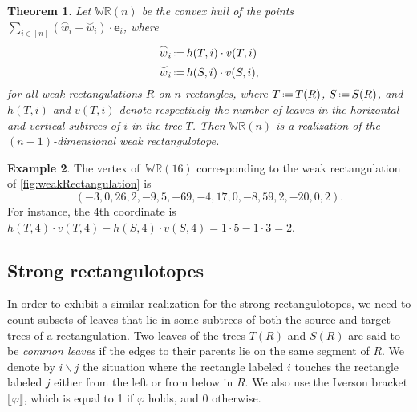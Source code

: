 \documentclass{amsart}
\newtheorem{theorem}{Theorem}%
\theoremstyle{definition}
\newtheorem{example}[theorem]{Example}
\newcommand{\eqdef}{\mbox{\,\raisebox{0.2ex}{\scriptsize\ensuremath{\mathrm:}}\ensuremath{=}\,}} %
\newcommand{\darkblue}{\color{darkblue}} %
\newcommand{\defn}[1]{\textsl{\darkblue #1}} %
\newcommand{\polytope}[1]{\mathds{#1}} %
\newcommand{\WRP}{\polytope{WR}} %
\newcommand{\loday}[1]{\overset{\frown}{#1}}
\newcommand{\antiloday}[1]{\overset{\smile}{#1}}
\begin{document}
\begin{theorem}
  Let $\WRP (n)$ be the convex hull of the points
  $\sum_{i\in [n]} (\loday{w}_i - \antiloday{w}_i)\cdot \mathbf{e}_i$,
  where
  \[
  \begin{split}
    \loday{w}_i \eqdef & h(T, i)\cdot v(T,i) \\
    \antiloday{w}_i \eqdef & h(S, i)\cdot v(S,i),
  \end{split}
  \]
  for all weak rectangulations $R$ on $n$ rectangles, where $T \eqdef T(R)$, $S \eqdef S(R)$,
  and $h(T,i)$ and $v(T,i)$ denote respectively the number of leaves in the horizontal and vertical subtrees of $i$ in the tree $T$.
  Then $\WRP (n)$ is a realization of the $(n-1)$-dimensional weak rectangulotope.
\end{theorem}

\begin{example}
The vertex of~$\WRP (16)$ corresponding to the weak rectangulation of \cref{fig:weakRectangulation} is
\[
(-3, 0, 26, 2, -9, 5, -69, -4, 17, 0, -8, 59, 2, -20, 0, 2).
\]
For instance, the $4$th coordinate is $h(T, 4) \cdot v(T, 4) - h(S, 4) \cdot v(S, 4) = 1 \cdot 5 - 1 \cdot 3 = 2$.
\end{example}

\subsection{Strong rectangulotopes}

In order to exhibit a similar realization for the strong rectangulotopes, we need to count subsets of leaves that lie in some subtrees of both the source and target trees of a rectangulation.
Two leaves of the trees $T(R)$ and $S(R)$ are said to be \defn{common leaves} if the edges to their parents lie on the same segment of $R$. We denote by %
$i\backslash j$ the situation where the rectangle labeled $i$ touches the rectangle labeled $j$ either from the left or from below in $R$. %
We also use the Iverson bracket $\llbracket \varphi\rrbracket$, which is equal to 1 if $\varphi$ holds, and 0 otherwise.
\end{document}
